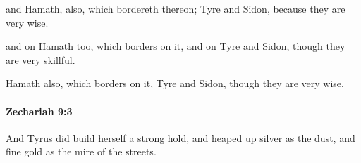 			\begin{versebox}
					\item[BHS] 
					\item[LXX] 
					\item[ASV] and Hamath, also, which bordereth thereon; Tyre and Sidon, because they are very wise.
					\item[NIV] and on Hamath too, which borders on it, and on Tyre and Sidon, though they are very skillful.
					\item[NRSV] Hamath also, which borders on it, Tyre and Sidon, though they are very wise.
			\end{versebox}

		\paragraph{Zechariah 9:3} %
			\label{ZECHARIAH-9-3}

			And Tyrus did build herself a strong hold, and heaped up silver as the dust, and fine gold as the mire of the streets.

